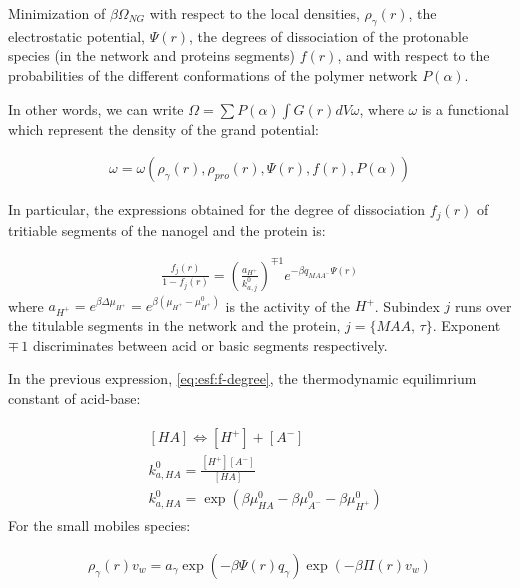 Minimization of $\beta\Omega_{NG}$ with respect to the local densities, $\rho_\gamma(r)$, the electrostatic potential, $\Psi(r)$, the degrees of dissociation of the protonable species (in the network and proteins segments) $f(r)$,  and with respect to the probabilities of the different conformations of the polymer network $P(\alpha)$.

In other words, we can write $\Omega = \sum P(\alpha) \int{G(r) dV\omega}$,  where $\omega$ is  a functional which represent the density of the grand potential: 

\begin{align}
	\omega=\omega(\rho_\gamma(r), \rho_{pro}(r),\Psi(r),f(r),P(\alpha))
\end{align}


In particular, the expressions obtained for the degree of dissociation $f_j(r)$ of tritiable segments of the nanogel and the protein is:

\begin{align}
	\frac{f_j(r)}{1-f_j(r)}= \left(\frac{a_{H^+}}{k^0_{a,j}}\right)^{\mp 1} e^{-\beta q_{MAA^-}\Psi(r)}
	\label{eq:esf:f-degree}
\end{align}
\noindent where $a_{H^+}=e^{\beta\Delta\mu_{H^+}}=e^{\beta(\mu_{H^+} -\mu^0_{H^+})}$ is the activity of the $H^+$. Subindex $j$ runs over the titulable segments in the network and the protein, $j =\{MAA , \, \tau \}$. Exponent $\mp \, 1$ discriminates between acid or basic segments respectively.

In the previous expression, \ref{eq:esf:f-degree}, the thermodynamic equilimrium  constant of  acid-base:

\begin{align}
	\begin{aligned}
		& \left[HA\right] \Longleftrightarrow [H^+] +[A^-] \\
		& k_{a,HA}^0=\frac{[H^+][A^-]}{[HA]} \\
		& k_{a,HA}^0=\exp\left(\beta\mu_{HA}^0 - \beta \mu_{A^-}^0 - \beta \mu^0_{H^+} \right)
	\end{aligned}
	\label{eq:esf:dis-rxn}
\end{align}
For the small mobiles species:

\begin{align}
	\rho_\gamma(r)v_w = a_\gamma \exp{\left(-\beta \Psi(r)q_\gamma\right)} \exp{\left(-\beta\Pi(r) v_w\right)}
\end{align}


